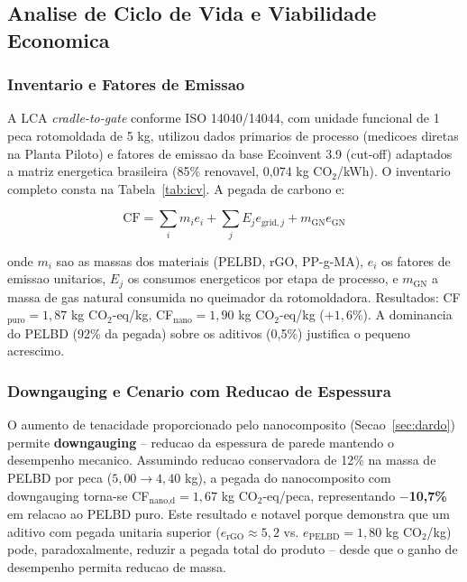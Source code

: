 \documentclass[11pt,a4paper,oneside]{article}
\begin{document}
\subsection{Analise de Ciclo de Vida e Viabilidade Economica}\label{sec:lca}

\subsubsection{Inventario e Fatores de Emissao}

A LCA \textit{cradle-to-gate} conforme ISO 14040/14044, com unidade funcional de 1 peca rotomoldada de 5 kg, utilizou dados primarios de processo (medicoes diretas na Planta Piloto) e fatores de emissao da base Ecoinvent 3.9 (cut-off) adaptados a matriz energetica brasileira (85\% renovavel, 0,074 kg CO$_2$/kWh). O inventario completo consta na Tabela~\ref{tab:icv}. A pegada de carbono e:

\begin{equation}
\text{CF} = \sum_i m_i e_i + \sum_j E_j e_{\text{grid},j} + m_{\text{GN}} e_{\text{GN}}
\label{eq:cf_completa}
\end{equation}

onde $m_i$ sao as massas dos materiais (PELBD, rGO, PP-g-MA), $e_i$ os fatores de emissao unitarios, $E_j$ os consumos energeticos por etapa de processo, e $m_{\text{GN}}$ a massa de gas natural consumida no queimador da rotomoldadora. Resultados: CF$_{\text{puro}}{=}1{,}87$ kg CO$_2$-eq/kg, CF$_{\text{nano}}{=}1{,}90$ kg CO$_2$-eq/kg ($+1{,}6\%$). A dominancia do PELBD (92\% da pegada) sobre os aditivos (0,5\%) justifica o pequeno acrescimo.

\subsubsection{Downgauging e Cenario com Reducao de Espessura}

O aumento de tenacidade proporcionado pelo nanocomposito (Secao~\ref{sec:dardo}) permite {\bfseries downgauging} -- reducao da espessura de parede mantendo o desempenho mecanico. Assumindo reducao conservadora de 12\% na massa de PELBD por peca ($5{,}00{\to}4{,}40$ kg), a pegada do nanocomposito com downgauging torna-se CF$_{\text{nano,d}}{=}1{,}67$ kg CO$_2$-eq/peca, representando {\bfseries $-$10,7\%} em relacao ao PELBD puro. Este resultado e notavel porque demonstra que um aditivo com pegada unitaria superior ($e_{\text{rGO}}{\approx}5{,}2$ vs. $e_{\text{PELBD}}{=}1{,}80$ kg CO$_2$/kg) pode, paradoxalmente, reduzir a pegada total do produto -- desde que o ganho de desempenho permita reducao de massa.
\end{document}
